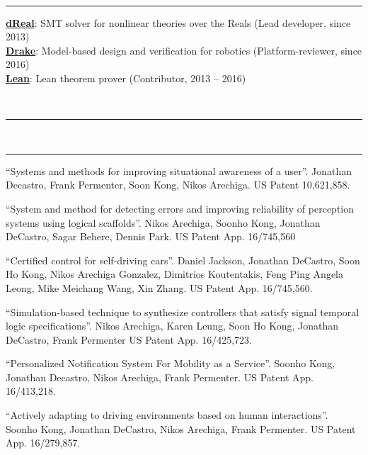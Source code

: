 \documentclass[10pt, letterpaper]{article}
\newcommand{\mysection}[1]{
  \vspace{20pt}\noindent{\rmfamily\mdseries \Large #1}\\
  \vspace{-6pt}\hrule\vspace{3pt}
}
\begin{document}
\mysection{Software}
\href{https://github.com/dreal/dreal4}{\textbf{dReal}}: SMT solver for nonlinear theories over the Reals \hfill (Lead developer, since 2013)\\
\href{https://drake.mit.edu}{\textbf{Drake}}: Model-based design and verification for robotics \hfill (Platform-reviewer, since 2016)\\
\href{https://leanprover.github.io}{\textbf{Lean}}: Lean theorem prover \hfill (Contributor, 2013 -- 2016)


\mysection{Publications}


\nocite{*}
\printbibliography[heading=none]

\mysection{Patents}

\begin{thebibliography}{9}

 ``Systems and methods for improving situational awareness of a user''.
Jonathan Decastro, Frank Permenter, Soon Kong, Nikos Arechiga.
US Patent 10,621,858.

 ``System and method for detecting errors and improving reliability of perception systems using logical scaffolds''.
  Nikos Arechiga, Soonho Kong, Jonathan DeCastro, Sagar Behere, Dennis Park.
  US Patent App. 16/745,560

 ``Certified control for self-driving cars''.
  Daniel Jackson, Jonathan DeCastro, Soon Ho Kong, Nikos Arechiga Gonzalez, Dimitrios Koutentakis, Feng Ping Angela Leong, Mike Meichang Wang, Xin Zhang.
  US Patent App. 16/745,560.

 ``Simulation-based technique to synthesize controllers that satisfy signal temporal logic specifications''.
Nikos Arechiga, Karen Leung, Soon Ho Kong, Jonathan DeCastro, Frank Permenter
US Patent App. 16/425,723.

 ``Personalized Notification System For Mobility as a Service''.
Soonho Kong, Jonathan Decastro, Nikos Arechiga, Frank Permenter.
US Patent App. 16/413,218.

 ``Actively adapting to driving environments based on human interactions''.
Soonho Kong, Jonathan DeCastro, Nikos Arechiga, Frank Permenter.
US Patent App. 16/279,857.

\end{thebibliography}
\end{document}
